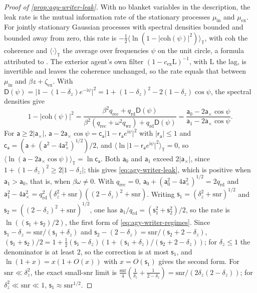 \begin{proof}[Proof of \cref{prop:agy-writer-leak}]
With no blanket variables in the description, the leak rate is the mutual information rate of the stationary processes $\mu_{\mathrm{in}}$ and $\mu_{\mathrm{ex}}$. For jointly stationary Gaussian processes with spectral densities bounded and bounded away from zero, this rate is $-\frac12\langle\ln(1-\lvert\mathrm{coh}(\psi)\rvert^2)\rangle_{\mathbb T}$, with $\mathrm{coh}$ the coherence and $\langle\cdot\rangle_{\mathbb T}$ the average over frequencies $\psi$ on the unit circle, a formula attributed to \citet{gelfand1959calculation}. The exterior agent's own filter $(1-c_{\mathrm{ex}}\mathrm L)^{-1}$, with $\mathrm L$ the lag, is invertible and leaves the coherence unchanged, so the rate equals that between $\mu_{\mathrm{in}}$ and $\beta z+\zeta_{\mathrm{ex}}$. With $\mathsf D(\psi)=\lvert1-(1-\delta_z)e^{-\mathrm i\psi}\rvert^2=1+(1-\delta_z)^2-2(1-\delta_z)\cos\psi$, the spectral densities give
\begin{equation*}
1-\lvert\mathrm{coh}(\psi)\rvert^2=\frac{\beta^2q_{\mathrm{rec}}+q_{\mathrm{rd}}\mathsf D(\psi)}{\beta^2(q_{\mathrm{rec}}+\omega^2q_{\mathrm{wr}})+q_{\mathrm{rd}}\mathsf D(\psi)}=\frac{\mathsf a_0-2\mathsf a_\times\cos\psi}{\mathsf a_1-2\mathsf a_\times\cos\psi}.
\end{equation*}
For $\mathsf a\ge2\lvert\mathsf a_\times\rvert$, $\mathsf a-2\mathsf a_\times\cos\psi=\mathsf c_{\mathsf a}\lvert1-\mathsf r_{\mathsf a}e^{\mathrm i\psi}\rvert^2$ with $\lvert\mathsf r_{\mathsf a}\rvert\le1$ and $\mathsf c_{\mathsf a}=(\mathsf a+(\mathsf a^2-4\mathsf a_\times^2)^{1/2})/2$, and $\langle\ln\lvert1-\mathsf r_{\mathsf a}e^{\mathrm i\psi}\rvert^2\rangle_{\mathbb T}=0$, so $\langle\ln(\mathsf a-2\mathsf a_\times\cos\psi)\rangle_{\mathbb T}=\ln\mathsf c_{\mathsf a}$. Both $\mathsf a_0$ and $\mathsf a_1$ exceed $2\lvert\mathsf a_\times\rvert$, since $1+(1-\delta_z)^2\ge2\lvert1-\delta_z\rvert$; this gives \eqref{eq:agy-writer-leak}, which is positive when $\mathsf a_1>\mathsf a_0$, that is, when $\beta\omega\ne0$. With $q_{\mathrm{rec}}=0$, $\mathsf a_0+(\mathsf a_0^2-4\mathsf a_\times^2)^{1/2}=2q_{\mathrm{rd}}$ and $\mathsf a_1^2-4\mathsf a_\times^2=q_{\mathrm{rd}}^2(\delta_z^2+\mathrm{snr})((2-\delta_z)^2+\mathrm{snr})$. Writing $\mathsf s_1=(\delta_z^2+\mathrm{snr})^{1/2}$ and $\mathsf s_2=((2-\delta_z)^2+\mathrm{snr})^{1/2}$, one has $\mathsf a_1/q_{\mathrm{rd}}=(\mathsf s_1^2+\mathsf s_2^2)/2$, so the rate is $\ln((\mathsf s_1+\mathsf s_2)/2)$, the first form of \eqref{eq:agy-writer-regimes}. Since $\mathsf s_1-\delta_z=\mathrm{snr}/(\mathsf s_1+\delta_z)$ and $\mathsf s_2-(2-\delta_z)=\mathrm{snr}/(\mathsf s_2+2-\delta_z)$, $(\mathsf s_1+\mathsf s_2)/2=1+\frac12(\mathsf s_1-\delta_z)(1+(\mathsf s_1+\delta_z)/(\mathsf s_2+2-\delta_z))$; for $\delta_z\le1$ the denominator is at least $2$, so the correction is at most $\mathsf s_1$, and $\ln(1+x)=x(1+O(x))$ with $x=O(\mathsf s_1)$ gives the second form. For $\mathrm{snr}\ll\delta_z^2$, the exact small-$\mathrm{snr}$ limit is $\frac{\mathrm{snr}}4(\frac1{\delta_z}+\frac1{2-\delta_z})=\mathrm{snr}/(2\delta_z(2-\delta_z))$; for $\delta_z^2\ll\mathrm{snr}\ll1$, $\mathsf s_1\approx\mathrm{snr}^{1/2}$.
\end{proof}

